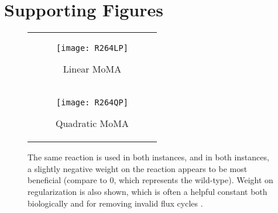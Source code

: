 \section{Supporting Figures}

\begin{figure}[H]
\centering
\begin{tabular}{c}
\begin{subfigure}[b]{\textwidth}
  \texttt{[image: R264LP]}
  \caption{Linear MoMA} 
  \label{fig:R264LP}
\end{subfigure}
\\
\begin{subfigure}[b]{\textwidth}
  \texttt{[image: R264QP]}
  \caption{Quadratic MoMA} 
  \label{fig:R264QP}
\end{subfigure}
\\
\end{tabular}
\caption{The same reaction is used in both instances, and in both
instances, a slightly negative weight on the reaction appears to be
most beneficial (compare to 0, which represents the wild-type).
Weight on regularization is also shown, which is often a helpful
constant both biologically and for removing invalid flux cycles 
\citep{Schuetz2012, Smallbone2009a}.}
\label{fig:wMoMA_smoothness}
\end{figure}
